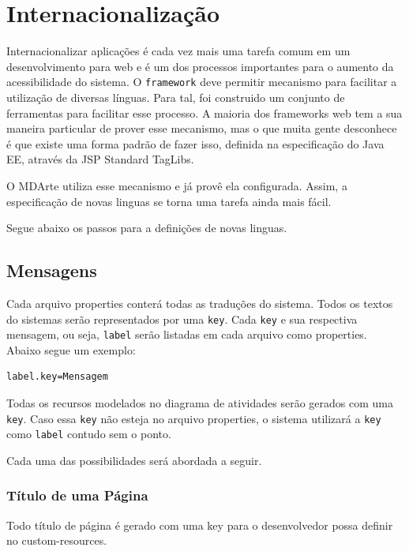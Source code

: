 \section{Internacionalização}

Internacionalizar aplicações é cada vez mais uma tarefa comum em um desenvolvimento para web e é um dos processos importantes para o aumento da acessibilidade do sistema. O \texttt{framework} deve permitir mecanismo para facilitar a utilização de diversas línguas. Para tal, foi construido um conjunto de ferramentas para facilitar esse processo. A maioria dos frameworks web tem a sua maneira particular de prover esse mecanismo, mas o que muita gente desconhece é que existe uma forma padrão de fazer isso, definida na especificação do Java EE, através da JSP Standard TagLibs.

O MDArte utiliza esse mecanismo e já provê ela configurada. Assim, a especificação de novas linguas se torna uma tarefa ainda mais fácil.

Segue abaixo os passos para a definições de novas linguas.

\subsection{Mensagens}

Cada arquivo properties conterá todas as traduções do sistema. Todos os textos
do sistemas serão representados por uma \texttt{key}. Cada \texttt{key} e sua
respectiva mensagem, ou seja, \texttt{label} serão listadas em cada arquivo como
properties. Abaixo segue um exemplo:

\begin{lstlisting}[language=xml, frame=single, breaklines=true]
	label.key=Mensagem
\end{lstlisting}

Todas os recursos modelados no diagrama de atividades serão gerados com uma \texttt{key}.
Caso essa \texttt{key} não esteja no arquivo properties, o sistema utilizará a
\texttt{key} como \texttt{label} contudo sem o ponto.

Cada uma das possibilidades será abordada a seguir.

\subsubsection{Título de uma Página}

Todo título de página é gerado com uma key para o desenvolvedor possa definir no
custom-resources. 

